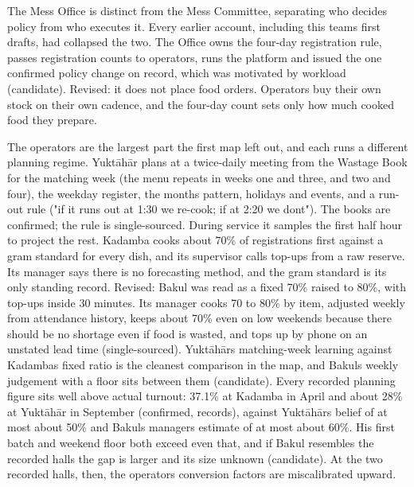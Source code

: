 \documentclass[
  10pt,
  table]{article}
\begin{document}
The Mess Office is distinct from the Mess Committee, separating who decides policy from who executes it. Every earlier account, including this team\textquotesingle s first drafts, had collapsed the two. The Office owns the four-day registration rule, passes registration counts to operators, runs the platform and issued the one confirmed policy change on record, which was motivated by workload (candidate). Revised: it does not place food orders. Operators buy their own stock on their own cadence, and the four-day count sets only how much cooked food they prepare.

The operators are the largest part the first map left out, and each runs a different planning regime. Yuktāhār plans at a twice-daily meeting from the Wastage Book for the matching week (the menu repeats in weeks one and three, and two and four), the weekday register, the month\textquotesingle s pattern, holidays and events, and a run-out rule ("if it runs out at 1:30 we re-cook; if at 2:20 we don\textquotesingle t"). The books are confirmed; the rule is single-sourced. During service it samples the first half hour to project the rest. Kadamba cooks about 70\% of registrations first against a gram standard for every dish, and its supervisor calls top-ups from a raw reserve. Its manager says there is no forecasting method, and the gram standard is its only standing record. Revised: Bakul was read as a fixed 70\% raised to 80\%, with top-ups inside 30 minutes. Its manager cooks 70 to 80\% by item, adjusted weekly from attendance history, keeps about 70\% even on low weekends because there should be no shortage even if food is wasted, and tops up by phone on an unstated lead time (single-sourced). Yuktāhār\textquotesingle s matching-week learning against Kadamba\textquotesingle s fixed ratio is the cleanest comparison in the map, and Bakul\textquotesingle s weekly judgement with a floor sits between them (candidate). Every recorded planning figure sits well above actual turnout: 37.1\% at Kadamba in April and about 28\% at Yuktāhār in September (confirmed, records), against Yuktāhār\textquotesingle s belief of at most about 50\% and Bakul\textquotesingle s manager\textquotesingle s estimate of at most about 60\%. His first batch and weekend floor both exceed even that, and if Bakul resembles the recorded halls the gap is larger and its size unknown (candidate). At the two recorded halls, then, the operators\textquotesingle{} conversion factors are miscalibrated upward.
\end{document}
